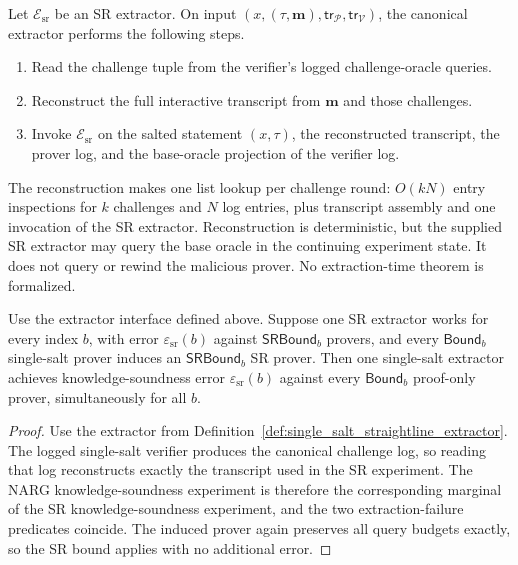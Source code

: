 \begin{definition}
  \label{def:single_salt_straightline_extractor}
  Let $\mathcal E_{\mathrm{sr}}$ be an SR extractor.  On input
  $(x,(\tau,\mathbf m),\mathsf{tr}_{\mathcal P},\mathsf{tr}_{\mathcal V})$, the canonical
  extractor performs the following steps.
  \begin{enumerate}
    \item Read the challenge tuple from the verifier's logged challenge-oracle queries.
    \item Reconstruct the full interactive transcript from $\mathbf m$ and those challenges.
    \item Invoke $\mathcal E_{\mathrm{sr}}$ on the salted statement $(x,\tau)$, the reconstructed
      transcript, the prover log, and the base-oracle projection of the verifier log.
  \end{enumerate}
  The reconstruction makes one list lookup per challenge round: $O(kN)$ entry inspections
  for $k$ challenges and $N$ log entries, plus transcript assembly and one invocation of the
  SR extractor. Reconstruction is deterministic, but the supplied SR extractor may query
  the base oracle in the continuing experiment state. It does not query or rewind the malicious
  prover. No extraction-time theorem is formalized.
  \leanok
\end{definition}

\begin{theorem}
  \label{thm:single_salt_fiat_shamir_straightline_knowledge_soundness}
  Use the extractor interface defined above.
  Suppose one SR extractor works for every index $b$, with error
  $\varepsilon_{\mathrm{sr}}(b)$ against $\mathsf{SRBound}_b$ provers, and every
  $\mathsf{Bound}_b$ single-salt prover induces an $\mathsf{SRBound}_b$ SR prover. Then one
  single-salt extractor achieves knowledge-soundness error
  $\varepsilon_{\mathrm{sr}}(b)$ against every $\mathsf{Bound}_b$ proof-only prover,
  simultaneously for all $b$.
  \leanok
\end{theorem}

\begin{proof}
  Use the extractor from Definition~\ref{def:single_salt_straightline_extractor}.  The logged
  single-salt verifier produces the canonical challenge log, so reading that log reconstructs
  exactly the transcript used in the SR experiment.  The NARG knowledge-soundness experiment is
  therefore the corresponding marginal of the SR knowledge-soundness experiment, and the two
  extraction-failure predicates coincide.  The induced prover again preserves all query budgets
  exactly, so the SR bound applies with no additional error.
  \leanok
\end{proof}

